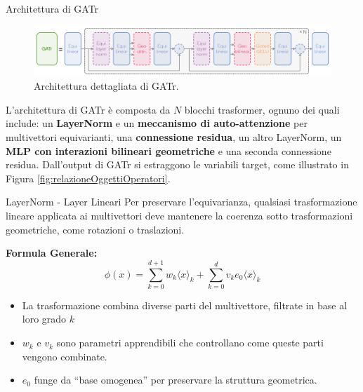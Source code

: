 \begin{frame}{Architettura di GATr}
    \begin{figure}
        \centering
        \includegraphics[width=1\textwidth]{../Images/GatrArchitecture.png}
        \caption{Architettura dettagliata di GATr.}
    \end{figure}
    
    L'architettura di GATr è composta da \( N \) blocchi trasformer, ognuno dei quali 
    include: un \textbf{LayerNorm} e un \textbf{meccanismo di auto-attenzione} per multivettori 
    equivarianti, una \textbf{connessione residua}, un altro LayerNorm, un \textbf{MLP con interazioni 
    bilineari geometriche} e una seconda connessione residua. 
    Dall’output di GATr si estraggono le variabili target, come illustrato in 
    Figura \ref{fig:relazioneOggettiOperatori}.
\end{frame}

\begin{frame}{LayerNorm - Layer Lineari}  
    Per preservare l’equivarianza, qualsiasi trasformazione lineare applicata ai 
    multivettori deve mantenere la coerenza sotto trasformazioni geometriche, come 
    rotazioni o traslazioni.

    \textbf{Formula Generale:}  
    \[
        \phi(x) = \sum_{k = 0}^{d+1} w_k {\langle x \rangle}_k + 
        \sum_{k = 0}^{d} v_k e_0 {\langle x \rangle}_k
    \]     

    \begin{itemize}
        \item La trasformazione combina diverse parti del multivettore, filtrate in base 
        al loro grado \( k \)
        \item \( w_k \) e \( v_k \) sono parametri apprendibili che controllano come 
        queste parti vengono combinate.
        \item \( e_0 \) funge da “base omogenea” per preservare la struttura geometrica.
    \end{itemize}
\end{frame}

